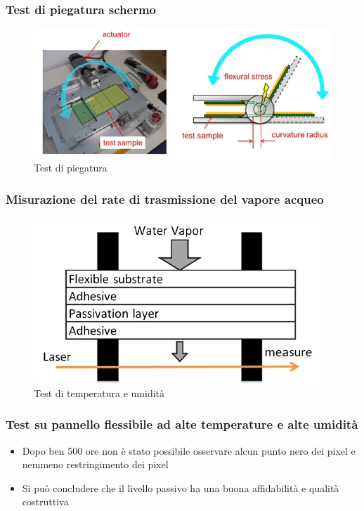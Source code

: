 \documentclass[12pt]{beamer}
\begin{document}
	\begin{frame}
		\frametitle{Test di piegatura schermo}
		\begin{figure}
			\centering
			\includegraphics[width=1\linewidth]{FISICA/test2}
			\caption{Test di piegatura}
			\label{fig:test2}
		\end{figure}
	\end{frame}
	\begin{frame}
		\frametitle{Misurazione del rate di trasmissione del vapore acqueo}
		\begin{figure}
			\centering
			\includegraphics[width=1\linewidth]{FISICA/test_temp}
			\caption{Test di temperatura e umidità}
			\label{fig:testtemp}
		\end{figure}
	\end{frame}
	\begin{frame}
		\frametitle{Test su pannello flessibile ad alte temperature e alte umidità}
		\begin{itemize}
			\item Dopo ben 500 ore non è stato possibile osservare alcun punto nero dei pixel e nemmeno restringimento dei pixel
			\pause
			\item Si può concludere che il livello passivo ha una buona affidabilità e qualità costruttiva
		\end{itemize}
	\end{frame}
\end{document}
